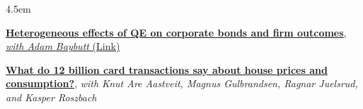 \documentclass{clean_CV}
\newcommand{\datetabspace}{4.5em}
\begin{document}
\begin{datetabular}{\datetabspace}
{%

\smallskip

\href{http://www.adambaybutt.org/uploads/1/2/4/9/124972193/baybutt_bojeryd-2021-qe_and_firms.pdf}{\textbf{Heterogeneous effects of QE on corporate bonds and firm outcomes}, \emph{with Adam Baybutt} (\href{https://www.anderson.ucla.edu/sites/default/files/document/2024-06/2024-11wp.pdf}{\underline{Link}})}

\smallskip

\href{https://escholarship.org/uc/item/6g6494m3}{\textbf{What do 12 billion card transactions say about house prices and consumption?}}, \emph{with Knut Are Aastveit, Magnus Gulbrandsen, Ragnar Juelsrud, and Kasper Roszbach}
}

\end{datetabular}
\end{document}
